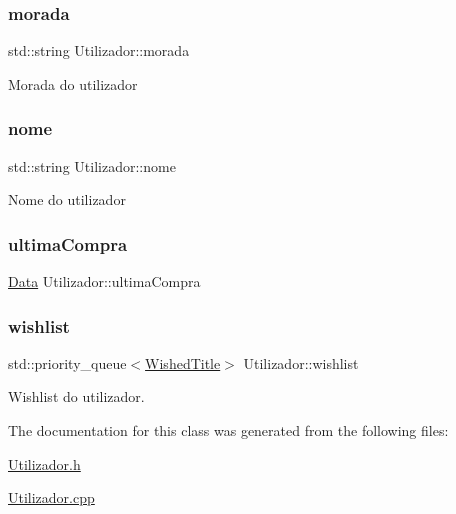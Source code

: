 \subsubsection{\texorpdfstring{morada}{morada}}
{\footnotesize\ttfamily std\+::string Utilizador\+::morada\hspace{0.3cm}{\ttfamily [private]}}

Morada do utilizador \mbox{\label{class_utilizador_ace8fd0a2f9414413e2966c8366e62b19}} 
\subsubsection{\texorpdfstring{nome}{nome}}
{\footnotesize\ttfamily std\+::string Utilizador\+::nome\hspace{0.3cm}{\ttfamily [private]}}

Nome do utilizador \mbox{\label{class_utilizador_acd065552d8fd82a50a3c66f7b67df971}} 
\subsubsection{\texorpdfstring{ultima\+Compra}{ultimaCompra}}
{\footnotesize\ttfamily \mbox{\hyperlink{class_data}{Data}} Utilizador\+::ultima\+Compra\hspace{0.3cm}{\ttfamily [private]}}

\mbox{\label{class_utilizador_a5c315459135b6ec84639951b52bfd551}} 
\subsubsection{\texorpdfstring{wishlist}{wishlist}}
{\footnotesize\ttfamily std\+::priority\+\_\+queue$<$\mbox{\hyperlink{class_wished_title}{Wished\+Title}}$>$ Utilizador\+::wishlist\hspace{0.3cm}{\ttfamily [private]}}



Wishlist do utilizador. 



The documentation for this class was generated from the following files\+:\begin{DoxyCompactItemize}
\item 
\mbox{\hyperlink{_utilizador_8h}{Utilizador.\+h}}\item 
\mbox{\hyperlink{_utilizador_8cpp}{Utilizador.\+cpp}}\end{DoxyCompactItemize}
